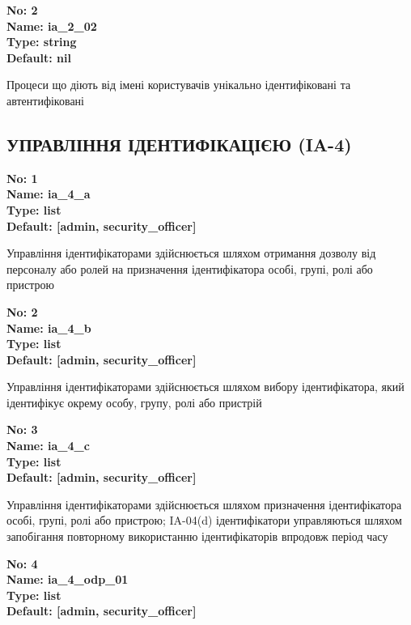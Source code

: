 \documentclass{article}
\begin{document}
{\footnotesize\bfseries
No: 2\\
Name: ia\_\allowbreak{}2\_\allowbreak{}02\\
Type: string\\
Default: nil
}

{\footnotesize Процеси що діють від імені користувачів унікально ідентифіковані та автентифіковані}




\subsection{УПРАВЛІННЯ ІДЕНТИФІКАЦІЄЮ (IA-4)}


\vspace{10pt}
{\footnotesize\bfseries
No: 1\\
Name: ia\_\allowbreak{}4\_\allowbreak{}a\\
Type: list\\
Default: [\textquotedbl{}admin\textquotedbl{}, \textquotedbl{}security\_\allowbreak{}officer\textquotedbl{}]
}

{\footnotesize Управління ідентифікаторами здійснюється шляхом отримання дозволу від персоналу або ролей на призначення ідентифікатора особі, групі, ролі або пристрою}


{\footnotesize\bfseries
No: 2\\
Name: ia\_\allowbreak{}4\_\allowbreak{}b\\
Type: list\\
Default: [\textquotedbl{}admin\textquotedbl{}, \textquotedbl{}security\_\allowbreak{}officer\textquotedbl{}]
}

{\footnotesize Управління ідентифікаторами здійснюється шляхом вибору ідентифікатора, який ідентифікує окрему особу, групу, ролі або пристрій}


{\footnotesize\bfseries
No: 3\\
Name: ia\_\allowbreak{}4\_\allowbreak{}c\\
Type: list\\
Default: [\textquotedbl{}admin\textquotedbl{}, \textquotedbl{}security\_\allowbreak{}officer\textquotedbl{}]
}

{\footnotesize Управління ідентифікаторами здійснюється шляхом призначення ідентифікатора особі, групі, ролі або пристрою; IA-04(d) ідентифікатори управляються шляхом запобігання повторному використанню ідентифікаторів впродовж період часу}


{\footnotesize\bfseries
No: 4\\
Name: ia\_\allowbreak{}4\_\allowbreak{}odp\_\allowbreak{}01\\
Type: list\\
Default: [\textquotedbl{}admin\textquotedbl{}, \textquotedbl{}security\_\allowbreak{}officer\textquotedbl{}]
}
\end{document}
